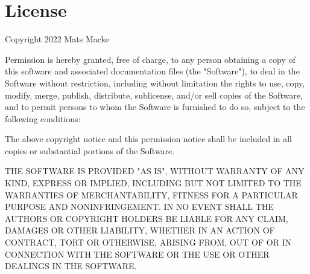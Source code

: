 \documentclass{article}
\begin{document}
\section{License}
Copyright 2022 Mats Macke

\vspace{10pt}
\noindent
Permission is hereby granted, free of charge, to any person obtaining a copy of this software and associated documentation files (the "Software"), to deal in the Software without restriction, including without limitation the rights to use, copy, modify, merge, publish, distribute, sublicense, and/or sell copies of the Software, and to permit persons to whom the Software is furnished to do so, subject to the following conditions:

\vspace{10pt}
\noindent
The above copyright notice and this permission notice shall be included in all copies or substantial portions of the Software.

\vspace{10pt}
\noindent
THE SOFTWARE IS PROVIDED "AS IS", WITHOUT WARRANTY OF ANY KIND, EXPRESS OR IMPLIED, INCLUDING BUT NOT LIMITED TO THE WARRANTIES OF MERCHANTABILITY, FITNESS FOR A PARTICULAR PURPOSE AND NONINFRINGEMENT. IN NO EVENT SHALL THE AUTHORS OR COPYRIGHT HOLDERS BE LIABLE FOR ANY CLAIM, DAMAGES OR OTHER LIABILITY, WHETHER IN AN ACTION OF CONTRACT, TORT OR OTHERWISE, ARISING FROM, OUT OF OR IN CONNECTION WITH THE SOFTWARE OR THE USE OR OTHER DEALINGS IN THE SOFTWARE.
\end{document}
